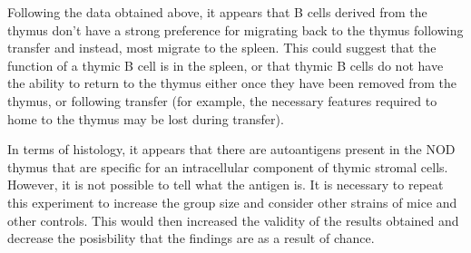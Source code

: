 Following the data obtained above, it appears that B cells derived from the thymus don't have a strong preference for migrating back to the thymus following transfer and instead, most migrate to the spleen.
This could suggest that the function of a thymic B cell is in the spleen, or that thymic B cells do not have the ability to return to the thymus either once they have been removed from the thymus, or following transfer (for example, the necessary features required to home to the thymus may be lost during transfer).

In terms of histology, it appears that there are autoantigens present in the NOD thymus that are specific for an intracellular component of thymic stromal cells.
However, it is not possible to tell what the antigen is.
It is necessary to repeat this experiment to increase the group size and consider other strains of mice and other controls.
This would then increased the validity of the results obtained and decrease the posisbility that the findings are as a result of chance.
